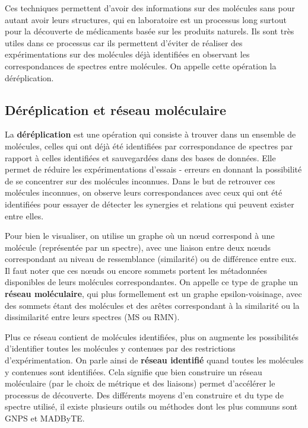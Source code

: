     Ces techniques permettent d'avoir des informations sur des molécules sans pour autant avoir leurs structures, qui en laboratoire est un processus long surtout pour la découverte de médicaments basée sur les produits naturels.
    Ils sont très utiles dans ce processus car ils permettent d'éviter de réaliser des expérimentations sur des molécules déjà identifiées en observant les correspondances de spectres entre molécules. On appelle cette opération la déréplication.
    
    \subsection{Déréplication et réseau moléculaire}

   	 La \textbf{déréplication} est une opération qui consiste à trouver dans un ensemble de molécules, celles qui ont déjà été identifiées par correspondance de spectres par rapport à celles identifiées et sauvegardées dans des bases de données.
   	 Elle permet de réduire les expérimentations d'essais - erreurs en donnant la possibilité de se concentrer sur des molécules inconnues.
   	 Dans le but de retrouver ces molécules inconnues, on observe leurs correspondances avec ceux qui ont été identifiées pour essayer de détecter les synergies et relations qui peuvent exister entre elles.
  	 
   	 Pour bien le visualiser, on utilise un graphe où un nœud correspond à une molécule (représentée par un spectre), avec une liaison entre deux nœuds correspondant au niveau de ressemblance (similarité) ou de différence entre eux.
   	 Il faut noter que ces nœuds ou encore sommets portent les métadonnées disponibles de leurs molécules correspondantes.
   	 On appelle ce type de graphe un \textbf{réseau moléculaire}, qui plus formellement est un graphe epsilon-voisinage, avec des sommets étant des molécules et des arêtes correspondant à la similarité ou la dissimilarité entre leurs spectres (\acrshort{MS} ou \acrshort{RMN}).
  	 
   	 Plus ce réseau contient de molécules identifiées, plus on augmente les possibilités d'identifier toutes les molécules y contenues par des restrictions d'expérimentation.
   	 On parle ainsi de \textbf{réseau identifié} quand toutes les molécules y contenues sont identifiées.
   	 Cela signifie que bien construire un réseau moléculaire (par le choix de métrique et des liaisons) permet d'accélérer le processus de découverte.
   	 Des différents moyens d'en construire et du type de spectre utilisé, il existe plusieurs outils ou méthodes dont les plus communs sont \acrfull{GNPS} et \acrfull{MADByTE}.
  	 
